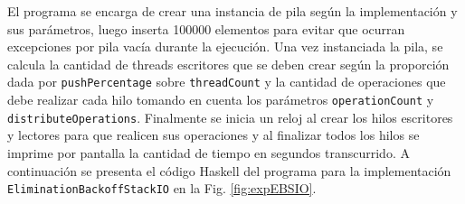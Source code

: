 El programa se encarga de crear una instancia de pila según la implementación y sus parámetros, luego inserta 100000 elementos para evitar que ocurran excepciones por pila vacía durante la ejecución.
Una vez instanciada la pila, se calcula la cantidad de threads escritores que se deben crear según la proporción dada por \texttt{pushPercentage} sobre \texttt{threadCount} y la cantidad de operaciones que debe realizar cada hilo tomando en cuenta los parámetros \texttt{operationCount} y \texttt{distributeOperations}.
Finalmente se inicia un reloj al crear los hilos escritores y lectores para que realicen sus operaciones y al finalizar todos los hilos se imprime por pantalla la cantidad de tiempo en segundos transcurrido.
A continuación se presenta el código Haskell del programa para la implementación \texttt{EliminationBackoffStackIO} en la Fig. \ref{fig:expEBSIO}.

